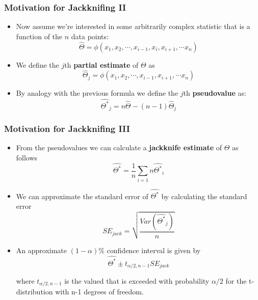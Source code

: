 \documentclass{beamer}
\begin{document}
\begin{frame}
  \frametitle{Motivation for Jackknifing II}

\begin{itemize}
    \item Now assume we're interested in some arbitrarily complex statistic that is a function of the $n$ data points:
\[
\widehat{\Theta} = \phi(x_1, x_2, \cdots, x_{i-1}, x_i, x_{i+1}, \cdots x_n)
\]

    \item We define the $j$th \textbf{partial estimate} of $\Theta$ as
\[
\widehat{\Theta}_j = \phi(x_1, x_2, \cdots, x_{i-1}, x_{i+1}, \cdots x_n)
\]

    \item By analogy with the previous formula we define the $j$th \textbf{pseudovalue} as:
\[
\widehat{\Theta^*}_j = n \widehat{\Theta} - (n-1)\widehat{\Theta}_j 
\]



\end{itemize}

\end{frame}
\begin{frame}
  \frametitle{Motivation for Jackknifing III}

\begin{itemize}
    \item From the pseudovalues we can calculate a \textbf{jackknife estimate} of $\Theta$ as follows
\[
\widehat{\Theta^*} = \frac{1}{n} \sum_{i=1}{n}\widehat{\Theta^*}_i
\]

    \item We can approximate the standard error of $\widehat{\Theta^*}$ by calculating the standard error
\[
SE_{jack} = \sqrt{\frac{Var(\widehat{\Theta^*}_j)}{n}}
\]


    \item An approximate $(1-\alpha)$\% confidence interval is given by
\[
\widehat{\Theta^*} \pm t_{\alpha/2, n-1} SE_{jack}
\]

where $t_{\alpha/2, n-1}$ is the valued that is exceeded with probability $\alpha/2$ for the t-distribution with n-1 degrees of freedom.

\end{itemize}

\end{frame}
\end{document}
